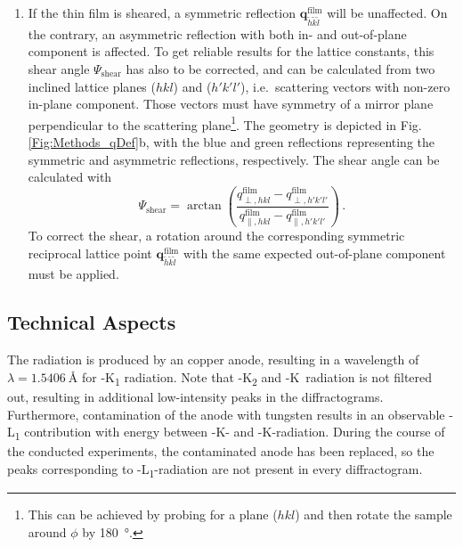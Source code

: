 \begin{enumerate}
    \item If the thin film is sheared, a symmetric reflection $\mathbf{q}_{\tilde{h}\tilde{k}\tilde{l}}^\mathrm{film}$ will be unaffected.
    On the contrary, an asymmetric reflection with both in- and out-of-plane component is affected.
    To get reliable results for the lattice constants, this shear angle $\Psi_\mathrm{shear}$ has also to be corrected, and can be calculated from two inclined lattice planes ($hkl$) and ($h'k'l'$), i.e.\ scattering vectors with non-zero in-plane component.
    Those vectors must have symmetry of a mirror plane perpendicular to the scattering plane\footnote{
        This can be achieved by probing for a plane ($hkl$) and then rotate the sample around $\phi$ by \qty{180}{\degree}.
    }.
    The geometry is depicted in Fig.\,\ref{Fig:Methods_qDef}b, with the blue and green reflections representing the symmetric and asymmetric reflections, respectively.
    The shear angle can be calculated with
    \begin{equation}
        \Psi_\mathrm{shear}=\arctan\left(\frac{
            q_{\perp,hkl}^\mathrm{film}
            -q_{\perp,h'k'l'}^\mathrm{film}
        }{
            q_{\parallel,hkl}^\mathrm{film}
            -q_{\parallel,h'k'l'}^\mathrm{film}
        }\right)\,.
        \label{Equ:Methods_shearAngle}
    \end{equation}
    To correct the shear, a rotation around the corresponding symmetric reciprocal lattice point $\mathbf{q}_{\tilde{h}\tilde{k}\tilde{l}}^\mathrm{film}$ with the same expected out-of-plane component must be applied.
\end{enumerate}

\subsection{Technical Aspects}
The radiation is produced by an copper anode, resulting in a wavelength of $\lambda=\qty{1.5406}{\angstrom}$ for -K\textalpha\textsubscript{1} radiation.
Note that -K\textalpha\textsubscript{2} and -K\textbeta\ radiation is not filtered out, resulting in additional low-intensity peaks in the diffractograms.
Furthermore, contamination of the anode with tungsten results in an observable -L\textalpha\textsubscript{1} contribution with energy between -K\textalpha- and -K\textbeta-radiation.
During the course of the conducted experiments, the contaminated anode has been replaced, so the peaks corresponding to -L\textalpha\textsubscript{1}-radiation are not present in every diffractogram.

